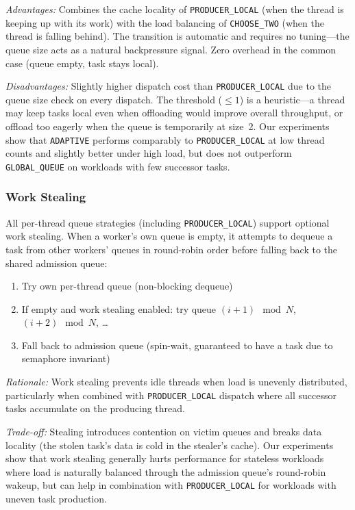 \begin{description}
    \textit{Advantages:} Combines the cache locality of \texttt{PRODUCER\_LOCAL} (when the thread is keeping up with its work) with the load balancing of \texttt{CHOOSE\_TWO} (when the thread is falling behind).
    The transition is automatic and requires no tuning---the queue size acts as a natural backpressure signal.
    Zero overhead in the common case (queue empty, task stays local).

    \textit{Disadvantages:} Slightly higher dispatch cost than \texttt{PRODUCER\_LOCAL} due to the queue size check on every dispatch.
    The threshold ($\leq 1$) is a heuristic---a thread may keep tasks local even when offloading would improve overall throughput, or offload too eagerly when the queue is temporarily at size~2.
    Our experiments show that \texttt{ADAPTIVE} performs comparably to \texttt{PRODUCER\_LOCAL} at low thread counts and slightly better under high load, but does not outperform \texttt{GLOBAL\_QUEUE} on workloads with few successor tasks.
\end{description}

\subsubsection{Work Stealing}

All per-thread queue strategies (including \texttt{PRODUCER\_LOCAL}) support optional work stealing.
When a worker's own queue is empty, it attempts to dequeue a task from other workers' queues in round-robin order before falling back to the shared admission queue:

\begin{enumerate}
    \item Try own per-thread queue (non-blocking dequeue)
    \item If empty and work stealing enabled: try queue $(i+1) \mod N$, $(i+2) \mod N$, \ldots
    \item Fall back to admission queue (spin-wait, guaranteed to have a task due to semaphore invariant)
\end{enumerate}

\textit{Rationale:} Work stealing prevents idle threads when load is unevenly distributed, particularly when combined with \texttt{PRODUCER\_LOCAL} dispatch where all successor tasks accumulate on the producing thread.

\textit{Trade-off:} Stealing introduces contention on victim queues and breaks data locality (the stolen task's data is cold in the stealer's cache).
Our experiments show that work stealing generally hurts performance for stateless workloads where load is naturally balanced through the admission queue's round-robin wakeup, but can help in combination with \texttt{PRODUCER\_LOCAL} for workloads with uneven task production.
